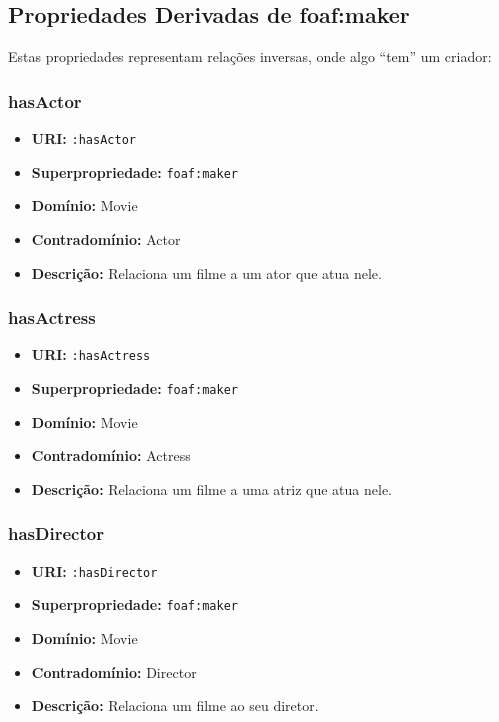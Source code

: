\documentclass[12pt,a4paper]{article}
\begin{document}
\subsection{Propriedades Derivadas de foaf:maker}

Estas propriedades representam relações inversas, onde algo ``tem'' um criador:

\subsubsection{hasActor}
\begin{itemize}
    \item \textbf{URI:} \texttt{:hasActor}
    \item \textbf{Superpropriedade:} \texttt{foaf:maker}
    \item \textbf{Domínio:} Movie
    \item \textbf{Contradomínio:} Actor
    \item \textbf{Descrição:} Relaciona um filme a um ator que atua nele.
\end{itemize}

\subsubsection{hasActress}
\begin{itemize}
    \item \textbf{URI:} \texttt{:hasActress}
    \item \textbf{Superpropriedade:} \texttt{foaf:maker}
    \item \textbf{Domínio:} Movie
    \item \textbf{Contradomínio:} Actress
    \item \textbf{Descrição:} Relaciona um filme a uma atriz que atua nele.
\end{itemize}

\subsubsection{hasDirector}
\begin{itemize}
    \item \textbf{URI:} \texttt{:hasDirector}
    \item \textbf{Superpropriedade:} \texttt{foaf:maker}
    \item \textbf{Domínio:} Movie
    \item \textbf{Contradomínio:} Director
    \item \textbf{Descrição:} Relaciona um filme ao seu diretor.
\end{itemize}
\end{document}
